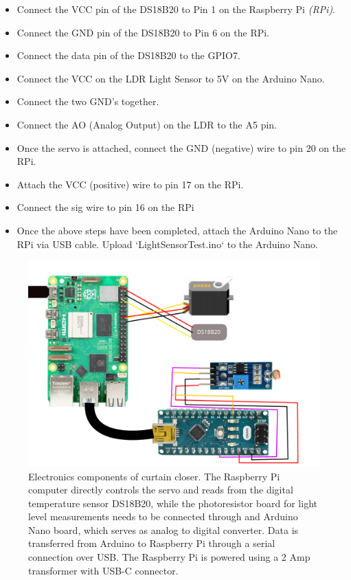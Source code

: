\documentclass[a4paper,12pt]{article}
\begin{document}
\begin{itemize}
    \item Connect the VCC pin of the DS18B20 to Pin 1  on the Raspberry Pi \emph{(RPi)}.
    \item Connect the GND pin of the DS18B20 to Pin 6 on the RPi.
    \item Connect the data pin of the DS18B20 to the GPIO7.

    \item Connect the VCC on the LDR Light Sensor to 5V on the Arduino Nano.
    \item Connect the two GND's together.
    \item Connect the AO (Analog Output) on the LDR to the A5 pin.

    \item Once the servo is attached, connect the GND (negative) wire to pin 20 on the RPi.
    \item Attach the VCC (positive) wire to pin 17 on the RPi.
    \item Connect the sig wire to pin 16 on the RPi

    \item Once the above steps have been completed, attach the Arduino Nano to the RPi via USB cable. Upload `LightSensorTest.ino` to the Arduino Nano.
\end{itemize}

\begin{figure}[h!]
    \includegraphics[width=\linewidth]{./figures/curtainCircuit.pdf}
    \caption{Electronics components of curtain closer. The Raspberry Pi computer directly controls the servo and reads from the digital temperature
    sensor DS18B20, while the photoresistor board for light level measurements needs to be connected through and Arduino Nano board, which serves as 
    analog to digital converter. Data is transferred from Arduino to Raspberry Pi through a serial connection over USB. The Raspberry Pi is powered
    using a 2 Amp transformer with USB-C connector.}
    \label{fig:plot1curtainCircuit}
  \end{figure}
\end{document}
